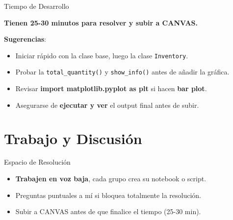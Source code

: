 \documentclass[10pt]{beamer}
\begin{document}
\begin{frame}{Tiempo de Desarrollo}
  \begin{block}{}
    \huge{\textbf{Tienen 25-30 minutos para resolver y subir a CANVAS.}}
  \end{block}
  \vspace{0.3cm}
  \textbf{Sugerencias}:
  \begin{itemize}
    \item Iniciar rápido con la clase base, luego la clase \texttt{Inventory}.
    \item Probar la \texttt{total\_quantity()} y \texttt{show\_info()} antes de añadir la gráfica.
    \item Revisar \textbf{import matplotlib.pyplot as plt} si hacen \textbf{bar plot}.
    \item Asegurarse de \textbf{ejecutar y ver} el output final antes de subir.
  \end{itemize}
\end{frame}

\section{Trabajo y Discusión}

\begin{frame}{Espacio de Resolución}
  \begin{itemize}
    \item \textbf{Trabajen en voz baja}, cada grupo crea su notebook o script.
    \item Preguntas puntuales a mí si bloquea totalmente la resolución.
    \item Subir a CANVAS antes de que finalice el tiempo (25-30 min).
  \end{itemize}
\end{frame}
\end{document}
